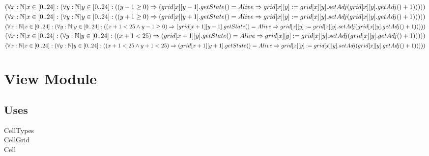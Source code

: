 \documentclass[12pt]{article}
\begin{document}
\noindent$ (\forall x : \mathbb{N} | x \in [0..24] : (\forall y : \mathbb{N} | y \in [0..24] :\\
((y-1 \ge 0) \Rightarrow (grid[x][y-1].getState() = Alive \Rightarrow\\ grid[x][y] := grid[x][y].setAdj(grid[x][y].getAdj()+1)))))$\\

\noindent$ (\forall x : \mathbb{N} | x \in [0..24] : (\forall y : \mathbb{N} | y \in [0..24] :\\
((y+1 \ge 0) \Rightarrow (grid[x][y+1].getState() = Alive \Rightarrow\\ grid[x][y] := grid[x][y].setAdj(grid[x][y].getAdj()+1)))))$\\

\noindent$ (\forall x : \mathbb{N} | x \in [0..24] : (\forall y : \mathbb{N} | y \in [0..24] :\\
((x+1 < 25 \land y - 1 \ge 0) \Rightarrow (grid[x+1][y-1].getState() = Alive \Rightarrow\\ grid[x][y] := grid[x][y].setAdj(grid[x][y].getAdj()+1)))))$\\

\noindent$ (\forall x : \mathbb{N} | x \in [0..24] : (\forall y : \mathbb{N} | y \in [0..24] :\\
((x+1 < 25) \Rightarrow (grid[x+1][y].getState() = Alive \Rightarrow\\ grid[x][y] := grid[x][y].setAdj(grid[x][y].getAdj()+1)))))$\\

\noindent$ (\forall x : \mathbb{N} | x \in [0..24] : (\forall y : \mathbb{N} | y \in [0..24] :\\
((x+1 < 25 \land y+1 < 25) \Rightarrow (grid[x+1][y+1].getState() = Alive \Rightarrow\\ grid[x][y] := grid[x][y].setAdj(grid[x][y].getAdj()+1)))))$\\
\newpage

\section* {View Module}

\subsection* {Uses}

\noindent CellTypes\\
\noindent CellGrid\\
\noindent Cell\\
\end{document}
